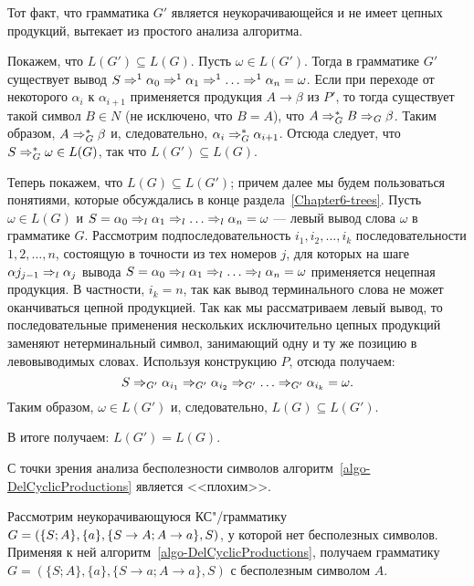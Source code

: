 \begin{myproof}
Тот факт, что грамматика $G'$ является неукорачивающейся и не имеет цепных продукций, вытекает из простого анализа алгоритма.

Покажем, что $L(G')\subseteq L(G)$. Пусть $\omega\in L(G')$. Тогда в грамматике $G'$ существует вывод $S\Rightarrow^1\alpha_0 \Rightarrow^1 \alpha_1 \Rightarrow^1 \ldots \Rightarrow^1 \alpha_n = \omega$. Если при переходе от некоторого $\alpha_i$ к $\alpha_{i+1}$ применяется продукция $A\to\beta$ из $P'$, то тогда существует такой символ $B\in N$ (не исключено, что $B=A$), что $A\Rightarrow_G^*B\Rightarrow_G\beta$. Таким образом, $A\Rightarrow_G^*\beta$ и, следовательно, $\alpha_i\Rightarrow_G^*\alpha_{i+1}$. Отсюда следует, что $S\Rightarrow_G^*\omega\in L(G)$, так что $L(G')\subseteq L(G)$.

Теперь покажем, что $L(G)\subseteq L(G')$; причем далее мы будем пользоваться понятиями, которые обсуждались в конце раздела~\ref{Chapter6-trees}. Пусть $\omega\in L(G)$ и $S=\alpha_0\Rightarrow_l\alpha_1\Rightarrow_l\ldots\Rightarrow_l\alpha_n=\omega$ --- левый вывод слова $\omega$ в грамматике $G$. Рассмотрим подпоследовательность $i_1, i_2, \ldots , i_k$ последовательности $1, 2, \ldots , n$, состоящую в точности из тех номеров $j$, для которых на шаге $\alpha j_{j-1}\Rightarrow_l\alpha_j$ вывода $S=\alpha_0\Rightarrow_l\alpha_1\Rightarrow_l\ldots\Rightarrow_l\alpha_n=\omega$ применяется нецепная продукция. В частности, $i_k=n$, так как вывод терминального слова не может оканчиваться цепной продукцией. Так как мы рассматриваем левый вывод, то последовательные применения нескольких исключительно цепных продукций заменяют нетерминальный символ, занимающий одну и ту же позицию в левовыводимых словах. Используя конструкцию $P$, отсюда получаем:
\[
S\Rightarrow_{G'}\alpha_{i_1}\Rightarrow_{G'}\alpha_{i_2}\Rightarrow_{G'}\ldots \Rightarrow_{G'} \alpha_{i_k}=\omega.
\]
Таким образом, $\omega\in L(G')$ и, следовательно, $L(G)\subseteq L(G')$.

В итоге получаем: $L(G')=L(G)$.
\end{myproof}

С точки зрения анализа бесполезности символов алгоритм~\ref{algo-DelCyclicProductions}
является <<плохим>>.

\begin{myexample}
Рассмотрим неукорачивающуюся КС"/грамматику $G=(\{S;A\},\{a\},\\\{S\to A;A\to a\},S)$, у которой нет бесполезных символов. Применяя к ней алгоритм~\ref{algo-DelCyclicProductions}, получаем грамматику $G=(\{S;A\},\{a\},\{S\to a;A\to a\},S)$ с бесполезным символом $A$.
\end{myexample}

